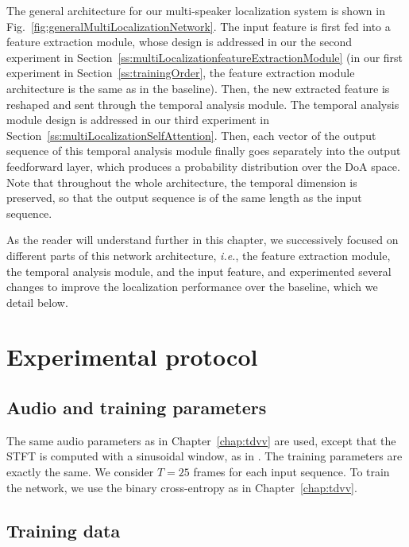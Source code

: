 The general architecture for our multi-speaker localization system is shown in Fig.~\ref{fig:generalMultiLocalizationNetwork}. The input feature is first fed into a feature extraction module, whose design is addressed in our the second experiment in Section~\ref{ss:multiLocalizationfeatureExtractionModule} (in our first experiment in Section~\ref{ss:trainingOrder}, the feature extraction module architecture is the same as in the baseline). Then, the new extracted feature is reshaped and sent through the temporal analysis module. The temporal analysis module design is addressed in our third experiment in Section~\ref{ss:multiLocalizationSelfAttention}. Then, each vector of the output sequence of this temporal analysis module finally goes separately into the output feedforward layer, which produces a probability distribution over the DoA space. Note that throughout the whole architecture, the temporal dimension is preserved, so that the output sequence is of the same length as the input sequence.

As the reader will understand further in this chapter, we successively focused on different parts of this network architecture, \emph{i.e.}, the feature extraction module, the temporal analysis module, and the input feature, and experimented several changes to improve the localization performance over the baseline, which we detail below.

\section{Experimental protocol}
\subsection{Audio and training parameters}

The same audio parameters as in Chapter~\ref{chap:tdvv} are used, except that the STFT is computed with a sinusoidal window, as in \cite{perotin_crnn-based_2019}. The training parameters are exactly the same. We consider $T=25$ frames for each input sequence. To train the network, we use the binary cross-entropy as in Chapter~\ref{chap:tdvv}.

\subsection{Training data}

